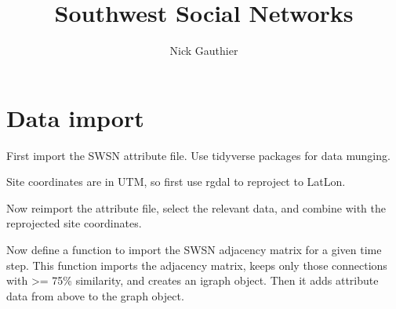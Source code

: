 \documentclass[]{article}
\title{Southwest Social Networks}
\author{Nick Gauthier}
\date{}
\newenvironment{Shaded}{\begin{snugshade}}{\end{snugshade}}
\newcommand{\KeywordTok}[1]{\textcolor[rgb]{0.13,0.29,0.53}{\textbf{{#1}}}}
\newcommand{\DataTypeTok}[1]{\textcolor[rgb]{0.13,0.29,0.53}{{#1}}}
\newcommand{\StringTok}[1]{\textcolor[rgb]{0.31,0.60,0.02}{{#1}}}
\newcommand{\NormalTok}[1]{{#1}}
\begin{document}
\maketitle

\section{Data import}\label{data-import}

First import the SWSN attribute file. Use tidyverse packages for data
munging.

Site coordinates are in UTM, so first use rgdal to reproject to LatLon.

\begin{Shaded}
\end{Shaded}

Now reimport the attribute file, select the relevant data, and combine
with the reprojected site coordinates.

\begin{Shaded}
\end{Shaded}

Now define a function to import the SWSN adjacency matrix for a given
time step. This function imports the adjacency matrix, keeps only those
connections with \textgreater{}= 75\% similarity, and creates an igraph
object. Then it adds attribute data from above to the graph object.
\end{document}
